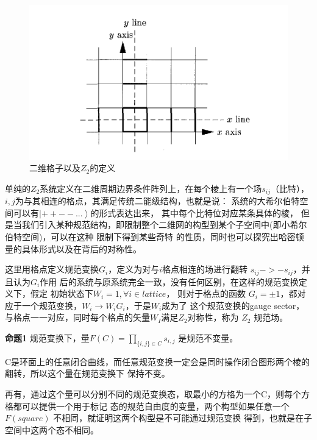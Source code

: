 \documentclass[a4paper]{article}
\begin{document}
\begin{figure}[htbp]
    \centering
    \includegraphics[scale=0.45]{6.png}
    \caption{二维格子以及$Z_2$的定义}
\end{figure}

单纯的$Z_2$系统定义在二维周期边界条件阵列上，在每个棱上有一个场$s_{ij}$（比特），
$i,j$为与其相连的格点，其满足传统二能级结构，也就是说：
系统的大希尔伯特空间可以有$\left|++--...\right>$的形式表达出来， 其中每个比特位对应某条具体的棱，
但是当我们引入某种规范结构，即限制整个二维网的构型到某个子空间中(即小希尔伯特空间)，可以在这种
限制下得到某些奇特
的性质，同时也可以探究出哈密顿量的具体形式以及在背后的对称性。

这里用格点定义规范变换$G_i$，定义为对与$i$格点相连的场进行翻转 $s_{ij} -> -s_{ij}$，并且认为$G_i$作用
后的系统与原系统完全一致，没有任何区别，在这样的规范变换定义下，假定
初始状态下$W_i = 1,\forall i\in lattice$，
则对于格点的函数 $G_i = \pm 1$，都对应于一个规范变换，$W_i \rightarrow W_iG_i$，于是$W_i$成为了
这个规范变换的gauge sector，与格点一一对应，同时每个格点的矢量$W_I$满足$Z_2$对称性，称为 $Z_2$ 规范场。

\hspace*{\fill}

\textbf{命题1} 规范变换下，量$F(C)=\prod_{\{i,j\} \in C}s_{i,j}$ 是规范不变量。

\hspace*{\fill}

C是环面上的任意闭合曲线，而任意规范变换一定会是同时操作闭合图形两个棱的翻转，所以这个量在规范变换下
保持不变。

再有，通过这个量可以分别不同的规范变换态，取最小的方格为一个C，则每个方格都可以提供一个用于标记
态的规范自由度的变量，两个构型如果任意一个 $F(square)$ 不相同，就证明这两个构型是不可能通过规范变换
得到，也就是在子空间中这两个态不相同。
\end{document}

